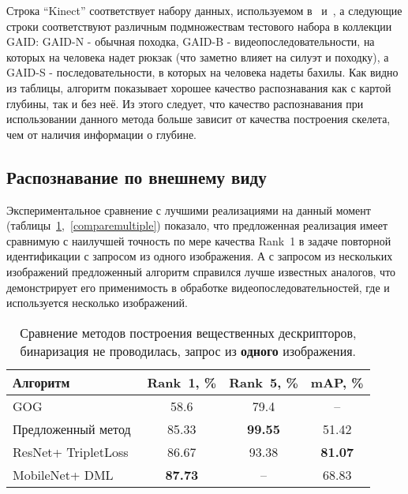 \documentclass[a4paper,twoside,11pt]{article}
\numberwithin{equation}{section}
\begin{document}
Строка “Kinect” соответствует набору данных, используемом в~\cite{andersson2015person} и~\cite{yang2016relative}, а следующие строки соответствуют различным подмножествам тестового набора в коллекции GAID: GAID-N - обычная походка, GAID-B - видеопоследовательности, на которых на человека надет рюкзак (что заметно влияет на силуэт и походку), а GAID-S - последовательности, в которых на человека надеты бахилы. Как видно из таблицы, алгоритм показывает хорошее качество распознавания как с картой глубины, так и без неё. Из этого следует, что качество распознавания при использовании данного метода больше зависит от качества построения скелета, чем от наличия информации о глубине.

\subsection{Распознавание по внешнему виду}

Экспериментальное сравнение с лучшими реализациями на данный момент (таблицы~\ref{comparesingle},~\ref{comparemultiple}) показало, что предложенная реализация имеет сравнимую с наилучшей точность по мере качества Rank~1 в задаче повторной идентификации с запросом из одного изображения. А с запросом из нескольких изображений предложенный алгоритм справился лучше известных аналогов, что демонстрирует его применимость в обработке видеопоследовательностей, где и используется несколько изображений.

\begin{table}[ht]\small
    \caption{Сравнение методов построения вещественных дескрипторов, бинаризация не проводилась, запрос из \textbf{одного} изображения.}
    \label{comparesingle}
    \centering\medskip%
    \begin{tabular}{ p{2.6cm} c c c } 
        \hline 
        Алгоритм & Rank~1, \% & Rank~5, \% & mAP, \% \\
        \hline
        GOG~\cite{karanam2016systematic} & 58.6 & 79.4 & -- \\
        Предложенный метод & 85.33 & \textbf{99.55} & 51.42 \\
        ResNet+ TripletLoss~\cite{hermans2017defense} & 86.67 & 93.38 & \textbf{81.07} \\
        MobileNet+ DML~\cite{zhang2017deep} & \textbf{87.73} & -- & 68.83 \\
        \hline
    \end{tabular}
\end{table}
\end{document}
